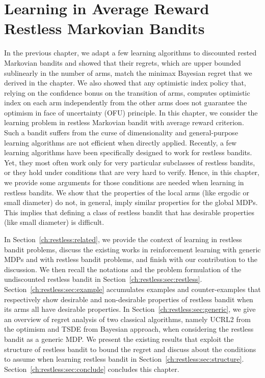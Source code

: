 \begingroup
\let\clearpage\relax

\chapter{Learning in Average Reward Restless Markovian Bandits}
\label{ch:learning_restless}

In the previous chapter, we adapt a few learning algorithms to discounted rested Markovian bandits and showed that their regrets, which are upper bounded sublinearly in the number of arms, match the minimax Bayesian regret that we derived in the chapter.
We also showed that any optimistic index policy that, relying on the confidence bonus on the transition of arms, computes optimistic index on each arm independently from the other arms does not guarantee the optimism in face of uncertainty (OFU) principle.
In this chapter, we consider the learning problem in restless Markovian bandit with average reward criterion.
Such a bandit suffers from the curse of dimensionality and general-purpose learning algorithms are not efficient when directly applied. Recently, a few learning algorithms have been specifically designed to work for restless bandits. Yet, they most often work only for very particular subclasses of restless bandits, or they hold under conditions that are very hard to verify.
Hence, in this chapter, we provide some arguments for those conditions are needed when learning in restless bandits. We show that the properties of the local arms (like ergodic or small diameter) do not, in general, imply similar properties for the global MDPs. This implies that defining a class of restless bandit that has desirable properties (like small diameter) is difficult. 

In Section~\ref{ch:restless:related}, we provide the context of learning in restless bandit problems, discuss the existing works in reinforcement learning with generic MDPs and with restless bandit problems, and finish with our contribution to the discussion.
We then recall the notations and the problem formulation of the undiscounted restless bandit in Section~\ref{ch:restless:sec:restless}.
Section~\ref{ch:restless:sec:example} accumulates examples and counter-examples that respectively show desirable and non-desirable properties of restless bandit when its arms all have desirable properties.
In Section~\ref{ch:restless:sec:generic}, we give an overview of regret analysis of two classical algorithms, namely UCRL2 \cite{jaksch2010near} from the optimism and TSDE \cite{ouyang2017learning} from Bayesian approach, when considering the restless bandit as a generic MDP.
We present the existing results that exploit the structure of restless bandit to bound the regret and discuss about the conditions to assume when learning restless bandit in Section~\ref{ch:restless:sec:structure}.
Section~\ref{ch:restless:sec:conclude} concludes this chapter.

